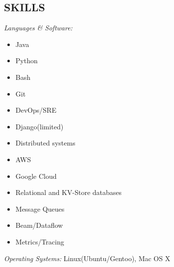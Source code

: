 \documentclass[margin]{res}
\begin{document}
\begin{resume}
\section{ SKILLS} {\sl Languages \& Software:}
            \begin{multicols}{3}
            \begin{itemize}
                \item Java
                \item Python
                \item Bash
                \item Git
                \item DevOps/SRE
                \item Django(limited)
                \item Distributed systems
                \item AWS
                \item Google Cloud
                \item Relational and KV-Store databases
                \item Message Queues
                \item Beam/Dataflow
                \item Metrics/Tracing
            \end{itemize}
            \end{multicols}

        {\sl Operating Systems:} Linux(Ubuntu/Gentoo), Mac OS X

\end{resume}
\end{document}
